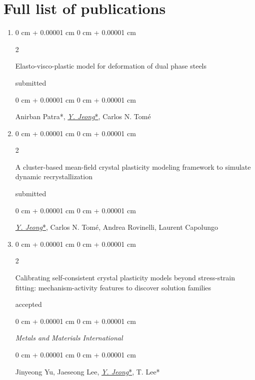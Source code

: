 \documentclass[10pt, letterpaper]{article}
\newenvironment{onecolentry}{
    \begin{adjustwidth}{
        0 cm + 0.00001 cm
    }{
        0 cm + 0.00001 cm
    }
}{
    \end{adjustwidth}
} %
\newenvironment{twocolentry}[2][]{
    \onecolentry
    \def\secondColumn{#2}
    \setcolumnwidth{\fill, 4.5 cm}
    \begin{paracol}{2}
}{
    \switchcolumn \raggedleft \secondColumn
    \end{paracol}
    \endonecolentry
} %
\begin{document}
        \newpage

        \section{Full list of publications}
        \begin{enumerate}




        \item
          \begin{twocolentry}{submitted}
            Elasto-visco-plastic model for deformation of dual phase steels
          \end{twocolentry}
          \begin{onecolentry}
            Anirban Patra*, {\underline{\textit{Y. Jeong}*}}, Carlos N. Tomé
          \end{onecolentry}
          \vspace{0.10 cm}



        \item
          \begin{twocolentry}{submitted}
            A cluster-based mean-field crystal plasticity modeling framework to simulate dynamic recrystallization
          \end{twocolentry}
          \begin{onecolentry}
            {\underline{\textit{Y. Jeong}*}}, Carlos N. Tomé, Andrea Rovinelli, Laurent Capolungo
          \end{onecolentry}
          \vspace{0.10 cm}


        \item
          \begin{twocolentry}{accepted}
            Calibrating self-consistent crystal plasticity models beyond stress-strain fitting: mechanism-activity features to discover solution families
          \end{twocolentry}
        \begin{onecolentry}
          {\it Metals and Materials International}
        \end{onecolentry}
          \begin{onecolentry}
            Jinyeong Yu, Jaeseong Lee, {\underline{\textit{Y. Jeong}*}}, T. Lee*
          \end{onecolentry}
          \vspace{0.10 cm}





\end{enumerate}
\end{document}
